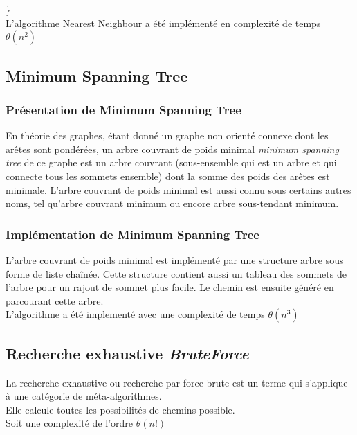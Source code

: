 \documentclass[12pt]{report}
\begin{document}
\indent\} \\

L'algorithme Nearest Neighbour a été implémenté en complexité de temps \(\theta(n^2)\)



\subsection{Minimum Spanning Tree}

\subsubsection{Présentation de Minimum Spanning Tree}

En théorie des graphes, étant donné un graphe non orienté connexe dont les arêtes sont pondérées, un arbre couvrant de poids minimal \textit{minimum spanning tree} de ce graphe est un arbre couvrant (sous-ensemble qui est un arbre et qui connecte tous les sommets ensemble) dont la somme des poids des arêtes est minimale. L'arbre couvrant de poids minimal est aussi connu sous certains autres noms, tel qu’arbre couvrant minimum ou encore arbre sous-tendant minimum.

\subsubsection{Implémentation de Minimum Spanning Tree}

\indent L'arbre couvrant de poids minimal est implémenté par une structure arbre sous forme de liste chaînée. Cette structure contient aussi un tableau des sommets de l'arbre pour un rajout de sommet plus facile. Le chemin est ensuite généré en parcourant cette arbre. \\

L'algorithme a été implementé avec une complexité de temps \(\theta(n^3)\) \\

\subsection{Recherche exhaustive \textit{BruteForce}}

La recherche exhaustive ou recherche par force brute est un terme qui s'applique à une catégorie de méta-algorithmes.\\
Elle calcule toutes les possibilités de chemins possible. \\
Soit une complexité de l'ordre \(\theta(n!)\) \\
\end{document}
